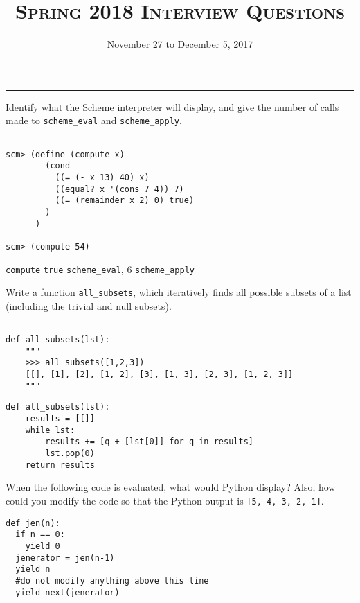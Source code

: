 \documentclass{exam}
\title{\textsc{Spring 2018 Interview Questions}}
\date{November 27 to December 5, 2017}
\begin{document}
\maketitle
\rule{\textwidth}{0.15em}
\fontsize{12}{15}\selectfont

\begin{questions}

\begin{blocksection}
\question Identify what the Scheme interpreter will display, and give the number of calls made to \lstinline$scheme_eval$ and \lstinline$scheme_apply$.
\begin{lstlisting}

scm> (define (compute x) 
        (cond 
          ((= (- x 13) 40) x) 
          ((equal? x '(cons 7 4)) 7) 
          ((= (remainder x 2) 0) true)
        )
      )

scm> (compute 54)

\end{lstlisting}

\begin{solution}
\lstinline$compute$ \linebreak
\lstinline$true$  \lstinline$scheme_eval$, 6 \lstinline$scheme_apply$
\end{solution}

\end{blocksection}

\begin{blocksection}
\question Write a function \lstinline$all_subsets$, which iteratively finds all possible subsets of a list (including the trivial and null subsets).
\begin{lstlisting}

def all_subsets(lst):
    """
    >>> all_subsets([1,2,3])
    [[], [1], [2], [1, 2], [3], [1, 3], [2, 3], [1, 2, 3]]
    """

\end{lstlisting}

\begin{solution}
\begin{lstlisting}
def all_subsets(lst):
    results = [[]]
    while lst:
        results += [q + [lst[0]] for q in results]
        lst.pop(0)
    return results
\end{lstlisting}    
\end{solution}

\end{blocksection}

\begin{blocksection}
\question When the following code is evaluated, what would Python display? Also, how could you modify the code so that the Python output is \lstinline$[5, 4, 3, 2, 1]$. 
\begin{lstlisting}
def jen(n):
  if n == 0:
    yield 0
  jenerator = jen(n-1)
  yield n
  #do not modify anything above this line
  yield next(jenerator)
  


\end{lstlisting}
\end{blocksection}
\end{questions}
\end{document}

